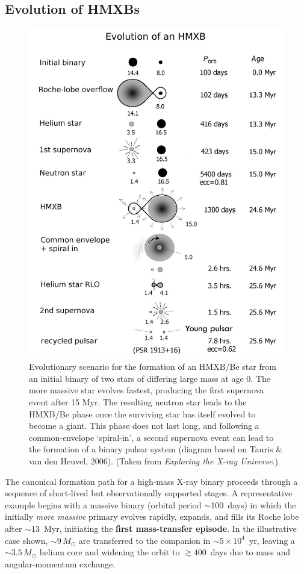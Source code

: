 \subsection{Evolution of HMXBs}
\begin{figure}
    \centering
    \includegraphics[width=1\linewidth]{Pictures/figures/hmxb_evol.png}
    \caption{Evolutionary scenario for the formation of an HMXB/Be star from an initial binary of two stars of differing large mass
at age 0. The more massive star evolves fastest, producing the first supernova event after 15 Myr. The resulting neutron star leads
to the HMXB/Be phase once the surviving star has itself evolved to become a giant. This phase does not last long, and following a
common-envelope ‘spiral-in’, a second supernova event can lead to the formation of a binary pulsar system (diagram based on
Tauris \& van den Heuvel, 2006). (Taken from \textit{Exploring the X-ray Universe}.)}
    \label{fig:hmxb_evolution}
\end{figure}
The canonical formation path for a high-mass X-ray binary proceeds through a sequence of short-lived but observationally supported stages. A representative example begins with a massive binary (orbital period $\sim$100~days) in which the initially \emph{more massive} primary evolves rapidly, expands, and fills its Roche lobe after $\sim 13$~Myr, initiating the \textbf{first mass-transfer episode}. In the illustrative case shown, $\sim 9\,M_\odot$ are transferred to the companion in $\sim 5\times10^4$~yr, leaving a $\sim 3.5\,M_\odot$ helium core and widening the orbit to $\gtrsim 400$~days due to mass and angular-momentum exchange.
